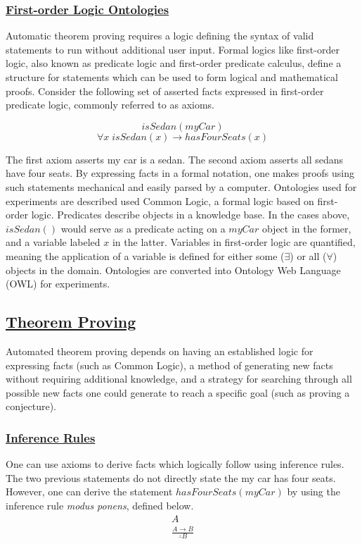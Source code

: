 \documentclass{article}
\begin{document}
\subsubsection{\underline{First-order Logic Ontologies}}

Automatic theorem proving requires a logic defining the syntax of valid statements to run without additional user input. Formal logics like first-order logic, also known as predicate logic and first-order predicate calculus, define a structure for statements which can be used to form logical and mathematical proofs. Consider the following set of asserted facts expressed in first-order predicate logic, commonly referred to as axioms. 

\begin{singlespace}
\[isSedan(myCar)\]
\[\forall x \; isSedan(x) \rightarrow hasFourSeats(x)\]
\end{singlespace} 

The first axiom asserts my car is a sedan. The second axiom asserts all sedans have four seats. By expressing facts in a formal notation, one makes proofs using such statements mechanical and easily parsed by a computer. Ontologies used for experiments are described used Common Logic, a formal logic based on first-order logic. Predicates describe objects in a knowledge base. In the cases above, $isSedan()$ would serve as a predicate acting on a $myCar$ object in the former, and a variable labeled $x$ in the latter. Variables in first-order logic are quantified, meaning the application of a variable is defined for either some ($\exists$) or all ($\forall$) objects in the domain. Ontologies are converted into Ontology Web Language (OWL) for experiments. 

\subsection{\underline{Theorem Proving}}
Automated theorem proving depends on having an established logic for expressing facts (such as Common Logic), a method of generating new facts without requiring additional knowledge, and a strategy for searching through all possible new facts one could generate to reach a specific goal (such as proving a conjecture).

\subsubsection{\underline{Inference Rules}}

One can use axioms to derive facts which logically follow using inference rules. The two previous statements do not directly state the my car has four seats. However, one can derive the statement $hasFourSeats(myCar)$ by using the inference rule \textit{modus ponens}, defined below. 
\begin{equation}
\begin{gathered}
A \\
\frac{A \rightarrow B}{\therefore B}
\end{gathered}
\end{equation}
\end{document}
